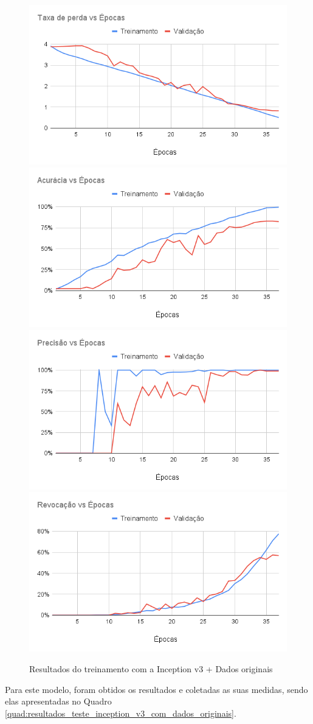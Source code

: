 \documentclass[
	12pt,				%
	oneside,			%
	a4paper,			%
	english,			%
	brazil				%
	]{abntex2ppgsi}
\begin{document}
\begin{figure}[H]
    \centering
    \caption{Resultados do treinamento com a Inception v3 + Dados originais}
    \includegraphics[width=.50\textwidth]{imagens/resultados_discussao/architecture/inception_v3/original/perda.png}\hfill
    \includegraphics[width=.50\textwidth]{imagens/resultados_discussao/architecture/inception_v3/original/acuracia.png}\bigbreak    \includegraphics[width=.50\textwidth]{imagens/resultados_discussao/architecture/inception_v3/original/precisao.png}\hfill
    \includegraphics[width=.50\textwidth]{imagens/resultados_discussao/architecture/inception_v3/original/revocacao.png}
    \label{fig:inception_v3_dados_originais}
\end{figure}

Para este modelo, foram obtidos os resultados e coletadas as suas medidas, sendo elas apresentadas no Quadro \ref{quad:resultados_teste_inception_v3_com_dados_originais}.
\end{document}
